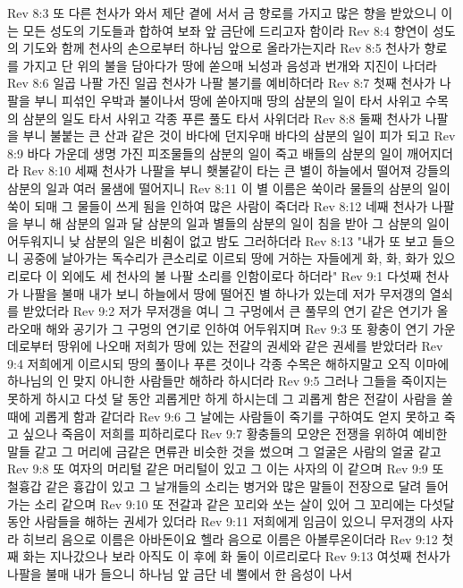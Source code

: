 Rev 8:3  또 다른 천사가 와서 제단 곁에 서서 금 향로를 가지고 많은 향을 받았으니 이는 모든 성도의 기도들과 합하여 보좌 앞 금단에 드리고자 함이라
Rev 8:4  향연이 성도의 기도와 함께 천사의 손으로부터 하나님 앞으로 올라가는지라
Rev 8:5  천사가 향로를 가지고 단 위의 불을 담아다가 땅에 쏟으매 뇌성과 음성과 번개와 지진이 나더라
Rev 8:6  일곱 나팔 가진 일곱 천사가 나팔 불기를 예비하더라
Rev 8:7  첫째 천사가 나팔을 부니 피섞인 우박과 불이나서 땅에 쏟아지매 땅의 삼분의 일이 타서 사위고 수목의 삼분의 일도 타서 사위고 각종 푸른 풀도 타서 사위더라
Rev 8:8  둘째 천사가 나팔을 부니 불붙는 큰 산과 같은 것이 바다에 던지우매 바다의 삼분의 일이 피가 되고
Rev 8:9  바다 가운데 생명 가진 피조물들의 삼분의 일이 죽고 배들의 삼분의 일이 깨어지더라
Rev 8:10  세째 천사가 나팔을 부니 횃불같이 타는 큰 별이 하늘에서 떨어져 강들의 삼분의 일과 여러 물샘에 떨어지니
Rev 8:11  이 별 이름은 쑥이라 물들의 삼분의 일이 쑥이 되매 그 물들이 쓰게 됨을 인하여 많은 사람이 죽더라
Rev 8:12  네째 천사가 나팔을 부니 해 삼분의 일과 달 삼분의 일과 별들의 삼분의 일이 침을 받아 그 삼분의 일이 어두워지니 낮 삼분의 일은 비췸이 없고 밤도 그러하더라
Rev 8:13  "내가 또 보고 들으니 공중에 날아가는 독수리가 큰소리로 이르되 땅에 거하는 자들에게 화, 화, 화가 있으리로다 이 외에도 세 천사의 불 나팔 소리를 인함이로다 하더라"
Rev 9:1  다섯째 천사가 나팔을 불매 내가 보니 하늘에서 땅에 떨어진 별 하나가 있는데 저가 무저갱의 열쇠를 받았더라
Rev 9:2  저가 무저갱을 여니 그 구멍에서 큰 풀무의 연기 같은 연기가 올라오매 해와 공기가 그 구멍의 연기로 인하여 어두워지며
Rev 9:3  또 황충이 연기 가운데로부터 땅위에 나오매 저희가 땅에 있는 전갈의 권세와 같은 권세를 받았더라
Rev 9:4  저희에게 이르시되 땅의 풀이나 푸른 것이나 각종 수목은 해하지말고 오직 이마에 하나님의 인 맞지 아니한 사람들만 해하라 하시더라
Rev 9:5  그러나 그들을 죽이지는 못하게 하시고 다섯 달 동안 괴롭게만 하게 하시는데 그 괴롭게 함은 전갈이 사람을 쏠 때에 괴롭게 함과 같더라
Rev 9:6  그 날에는 사람들이 죽기를 구하여도 얻지 못하고 죽고 싶으나 죽음이 저희를 피하리로다
Rev 9:7  황충들의 모양은 전쟁을 위하여 예비한 말들 같고 그 머리에 금같은 면류관 비슷한 것을 썼으며 그 얼굴은 사람의 얼굴 같고
Rev 9:8  또 여자의 머리털 같은 머리털이 있고 그 이는 사자의 이 같으며
Rev 9:9  또 철흉갑 같은 흉갑이 있고 그 날개들의 소리는 병거와 많은 말들이 전장으로 달려 들어가는 소리 같으며
Rev 9:10  또 전갈과 같은 꼬리와 쏘는 살이 있어 그 꼬리에는 다섯달 동안 사람들을 해하는 권세가 있더라
Rev 9:11  저희에게 임금이 있으니 무저갱의 사자라 히브리 음으로 이름은 아바돈이요 헬라 음으로 이름은 아볼루온이더라
Rev 9:12  첫째 화는 지나갔으나 보라 아직도 이 후에 화 둘이 이르리로다
Rev 9:13  여섯째 천사가 나팔을 불매 내가 들으니 하나님 앞 금단 네 뿔에서 한 음성이 나서
